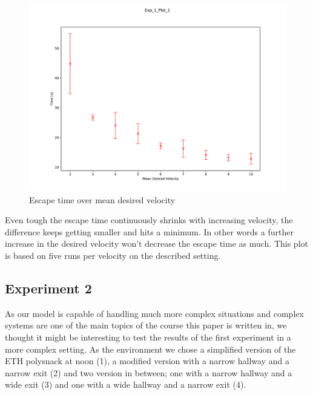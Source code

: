\documentclass[11pt]{article}
\begin{document}
\begin{figure}[H]
	\centering
	\includegraphics[width=.75\linewidth]{assets/Exp_1_Plot_1}\\
	Escape time over mean desired velocity
\end{figure}

Even tough the escape time continuously shrinks with increasing velocity, the difference keeps getting smaller and hits a minimum. In other words a further increase in the desired velocity won't  decrease the escape time as much. This plot is based on five runs per velocity on the described setting.


\subsection{Experiment 2}

As our model is capable of handling much more complex situations and complex systems are one of the main topics of the course this paper is written in, we  thought it might be interesting to test the results of the first experiment in a more complex setting. As the environment we chose a simplified version of the ETH polysnack at noon (1), a modified version with a narrow hallway and a narrow exit (2) and two version in between; one with a narrow hallway and a wide exit (3) and one with a wide hallway and a narrow exit (4).
\end{document}
